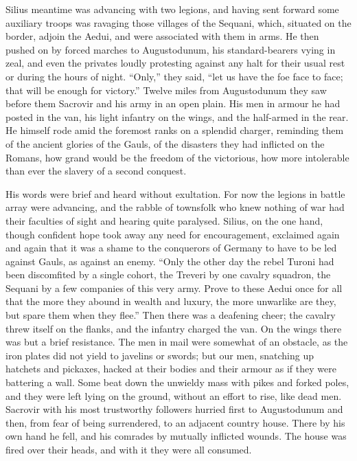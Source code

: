 Silius meantime was advancing with two legions, and having sent forward some auxiliary troops was ravaging those villages of the Sequani, which, situated on the border, adjoin the Aedui, and were associated with them in arms. He then pushed on by forced marches to Augustodunum, his standard-bearers vying in zeal, and even the privates loudly protesting against any halt for their usual rest or during the hours of night. ``Only,'' they said, ``let us have the foe face to face; that will be enough for victory.'' Twelve miles from Augustodunum they saw before them Sacrovir and his army in an open plain. His men in armour he had posted in the van, his light infantry on the wings, and the half-armed in the rear. He himself rode amid the foremost ranks on a splendid charger, reminding them of the ancient glories of the Gauls, of the disasters they had inflicted on the Romans, how grand would be the freedom of the victorious, how more intolerable than ever the slavery of a second conquest.


His words were brief and heard without exultation. For now the legions in battle array were advancing, and the rabble of townsfolk who knew nothing of war had their faculties of sight and hearing quite paralysed. Silius, on the one hand, though confident hope took away any need for encouragement, exclaimed again and again that it was a shame to the conquerors of Germany to have to be led against Gauls, as against an enemy. ``Only the other day the rebel Turoni had been discomfited by a single cohort, the Treveri by one cavalry squadron, the Sequani by a few companies of this very army. Prove to these Aedui once for all that the more they abound in wealth and luxury, the more unwarlike are they, but spare them when they flee.'' Then there was a deafening cheer; the cavalry threw itself on the flanks, and the infantry charged the van. On the wings there was but a brief resistance. The men in mail were somewhat of an obstacle, as the iron plates did not yield to javelins or swords; but our men, snatching up hatchets and pickaxes, hacked at their bodies and their armour as if they were battering a wall. Some beat down the unwieldy mass with pikes and forked poles, and they were left lying on the ground, without an effort to rise, like dead men. Sacrovir with his most trustworthy followers hurried first to Augustodunum and then, from fear of being surrendered, to an adjacent country house. There by his own hand he fell, and his comrades by mutually inflicted wounds. The house was fired over their heads, and with it they were all consumed.

